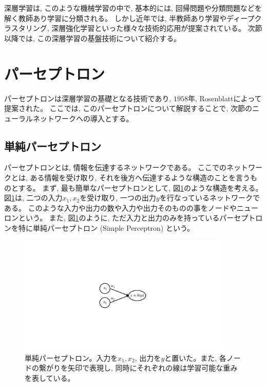 深層学習は, このような機械学習の中で, 基本的には, 回帰問題や分類問題などを解く教師あり学習に分類される。
しかし近年では, 半教師あり学習やディープクラスタリング, 深層強化学習といった様々な技術的応用が提案されている。
次節以降では, この深層学習の基盤技術について紹介する。


\section{パーセプトロン} \label{DL:Perceptron}

パーセプトロンは深層学習の基礎となる技術であり, $1958$年, Rosenblattによって提案された\cite{PerceptronPaper}。
ここでは, このパーセプトロンについて解説することで, 次節のニューラルネットワークへの導入とする。


\subsection{単純パーセプトロン} \label{DL:Percep:SimplePerceptron}

パーセプトロンとは, 情報を伝達するネットワークである。
ここでのネットワークとは, ある情報を受け取り, それを後方へ伝達するような構造のことを言うものとする。
まず, 最も簡単なパーセプトロンとして, 図\ref{2SimplePerceptron}のような構造を考える。
図\ref{2SimplePerceptron}は, 二つの入力$x_1,x_2$を受け取り, 一つの出力$y$を行なっているネットワークである。
このような入力や出力の数や入力や出力そのものの事をノードやニューロンという。
また, 図\ref{2SimplePerceptron}のように, ただ入力と出力のみを持っているパーセプトロンを特に単純パーセプトロン (Simple Perceptron) という。

\begin{figure}[htbp]
 \centering
 \includegraphics[trim = 250 350 250 350, width=0.9\textwidth, clip]{Figure/2DeepLearning/2SimplePerceptron.png}
 \caption[単純パーセプトロン]{単純パーセプトロン。入力を$x_1,x_2$, 出力を$y$と置いた。また, 各ノードの繋がりを矢印で表現し, 同時にそれぞれの線は学習可能な重みを表している。}
 \label{2SimplePerceptron}
\end{figure}

